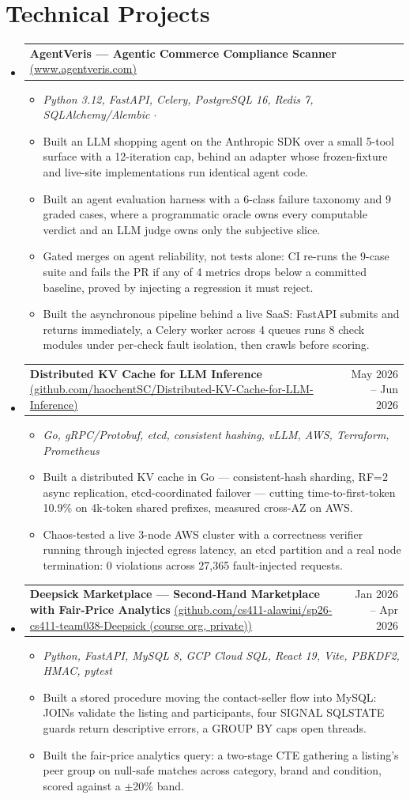 \documentclass[letterpaper,11pt]{article}
\makeatletter
\newcommand{\resumeItem}[1]{
  \item\small{
    {#1 \vspace{-2pt}}
  }
}
\newcommand{\resumeProjectHeading}[2]{
    \item
    \begin{tabular*}{0.97\textwidth}{l@{\extracolsep{\fill}}r}
      \small#1 & #2 \\
    \end{tabular*}\vspace{-7pt}
}
\newcommand{\resumeSubHeadingListStart}{\begin{itemize}[leftmargin=0.15in, label={}]}
\newcommand{\resumeSubHeadingListEnd}{\end{itemize}}
\newcommand{\resumeItemListStart}{\begin{itemize}}
\newcommand{\resumeItemListEnd}{\end{itemize}\vspace{-5pt}}
\makeatother
\begin{document}
\section{Technical Projects}
  \resumeSubHeadingListStart
\resumeProjectHeading
  {\textbf{AgentVeris --- Agentic Commerce Compliance Scanner} \href{https://www.agentveris.com/}{\scriptsize(www.agentveris.com)}}{}
  \resumeItemListStart
    \resumeItem{\emph{Python 3.12, FastAPI, Celery, PostgreSQL 16, Redis 7, SQLAlchemy/Alembic $\cdot$}}
    \resumeItem{Built an LLM shopping agent on the Anthropic SDK over a small 5-tool surface with a 12-iteration cap, behind an adapter whose frozen-fixture and live-site implementations run identical agent code.}
    \resumeItem{Built an agent evaluation harness with a 6-class failure taxonomy and 9 graded cases, where a programmatic oracle owns every computable verdict and an LLM judge owns only the subjective slice.}
    \resumeItem{Gated merges on agent reliability, not tests alone: CI re-runs the 9-case suite and fails the PR if any of 4 metrics drops below a committed baseline, proved by injecting a regression it must reject.}
    \resumeItem{Built the asynchronous pipeline behind a live SaaS: FastAPI submits and returns immediately, a Celery worker across 4 queues runs 8 check modules under per-check fault isolation, then crawls before scoring.}
  \resumeItemListEnd

\resumeProjectHeading
  {\textbf{Distributed KV Cache for LLM Inference} \href{https://github.com/haochentSC/Distributed-KV-Cache-for-LLM-Inference}{\scriptsize(github.com/haochentSC/Distributed-KV-Cache-for-LLM-Inference)}}{May 2026 -- Jun 2026}
  \resumeItemListStart
    \resumeItem{\emph{Go, gRPC/Protobuf, etcd, consistent hashing, vLLM, AWS, Terraform, Prometheus}}
    \resumeItem{Built a distributed KV cache in Go --- consistent-hash sharding, RF=2 async replication, etcd-coordinated failover --- cutting time-to-first-token 10.9\% on 4k-token shared prefixes, measured cross-AZ on AWS.}
    \resumeItem{Chaos-tested a live 3-node AWS cluster with a correctness verifier running through injected egress latency, an etcd partition and a real node termination: 0 violations across 27,365 fault-injected requests.}
  \resumeItemListEnd

\resumeProjectHeading
  {\textbf{Deepsick Marketplace --- Second-Hand Marketplace with Fair-Price Analytics} \href{https://github.com/cs411-alawini/sp26-cs411-team038-Deepsick (course org, private)}{\scriptsize(github.com/cs411-alawini/sp26-cs411-team038-Deepsick (course org, private))}}{Jan 2026 -- Apr 2026}
  \resumeItemListStart
    \resumeItem{\emph{Python, FastAPI, MySQL 8, GCP Cloud SQL, React 19, Vite, PBKDF2, HMAC, pytest}}
    \resumeItem{Built a stored procedure moving the contact-seller flow into MySQL: JOINs validate the listing and participants, four SIGNAL SQLSTATE guards return descriptive errors, a GROUP BY caps open threads.}
    \resumeItem{Built the fair-price analytics query: a two-stage CTE gathering a listing's peer group on null-safe matches across category, brand and condition, scored against a $\pm$20\% band.}
  \resumeItemListEnd
  \resumeSubHeadingListEnd
\end{document}
